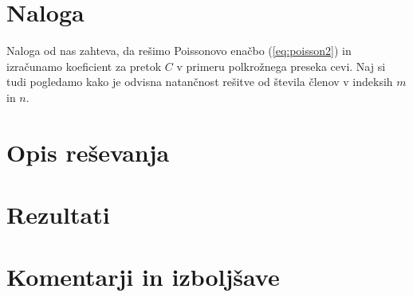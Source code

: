 \documentclass[a4paper]{article}
\begin{document}
\section{Naloga}
Naloga od nas zahteva, da rešimo Poissonovo enačbo (\ref{eq:poisson2}) in izračunamo koeficient za 
pretok $C$ v primeru polkrožnega preseka cevi. Naj si tudi pogledamo kako je odvisna natančnost
rešitve od števila členov v indeksih $m$ in $n$.\\
\section{Opis reševanja}

\section{Rezultati}


\section{Komentarji in izboljšave}


\newpage


\end{document}
